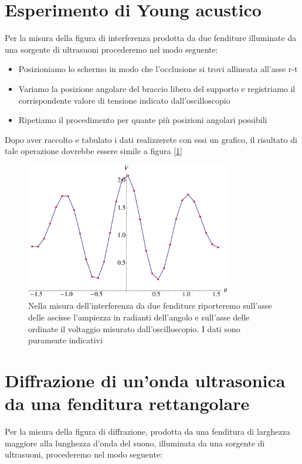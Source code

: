 \documentclass[a4paper,10pt,oneside]{article}
\begin{document}
\section*{Esperimento di Young acustico}

Per la misura della figura di interferenza prodotta da due fenditure illuminate da una sorgente di ultrasuoni procederemo nel modo seguente:

\begin{itemize}
 \item Posizioniamo lo schermo in modo che l'occlusione si trovi allineata all'asse r-t
 \item Variamo la posizione angolare del braccio libero del supporto e registriamo il corrispondente valore di tensione indicato dall'oscilloscopio
\item Ripetiamo il procedimento per quante più posizioni angolari possibili
\end{itemize}
Dopo aver raccolto e tabulato i dati realizzerete con essi un grafico, il risultato di tale operazione dovrebbe essere simile a figura [\ref{fig:esempio_young}]

\begin{figure}[H]
 \centering
 \includegraphics[width=0.8\textwidth]{../Immagini/esempio_misura_young.pdf}
 \caption{Nella misura dell'interferenza da due fenditure riporteremo sull'asse delle ascisse l'ampiezza in radianti dell'angolo e sull'asse delle ordinate il voltaggio misurato dall'oscilloscopio. I dati sono puramente indicativi}
 \label{fig:esempio_young}
\end{figure}


\section*{Diffrazione di un'onda ultrasonica da una fenditura rettangolare}
Per la misura della figura di diffrazione, prodotta da una fenditura di larghezza maggiore alla lunghezza d'onda del suono, illuminata da una sorgente di ultrasuoni, procederemo nel modo seguente:
\end{document}
